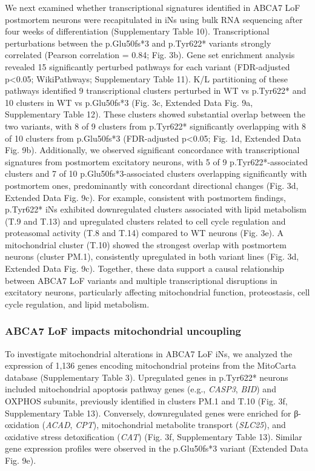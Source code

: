 We next examined whether transcriptional signatures identified in ABCA7 LoF postmortem neurons were recapitulated in iNs using bulk RNA sequencing after four weeks of differentiation (Supplementary Table 10). Transcriptional perturbations between the p.Glu50fs*3 and p.Tyr622* variants strongly correlated (Pearson correlation = 0.84; Fig. 3b). Gene set enrichment analysis revealed 15 significantly perturbed pathways for each variant (FDR-adjusted p<0.05; WikiPathways; Supplementary Table 11). K/L partitioning of these pathways identified 9 transcriptional clusters perturbed in WT vs p.Tyr622* and 10 clusters in WT vs p.Glu50fs*3 (Fig. 3c, Extended Data Fig. 9a, Supplementary Table 12). These clusters showed substantial overlap between the two variants, with 8 of 9 clusters from p.Tyr622* significantly overlapping with 8 of 10 clusters from p.Glu50fs*3 (FDR-adjusted p<0.05; Fig. 1d, Extended Data Fig. 9b). Additionally, we observed significant concordance with transcriptional signatures from postmortem excitatory neurons, with 5 of 9 p.Tyr622*-associated clusters and 7 of 10 p.Glu50fs*3-associated clusters overlapping significantly with postmortem ones, predominantly with concordant directional changes (Fig. 3d, Extended Data Fig. 9c). For example, consistent with postmortem findings, p.Tyr622* iNs exhibited downregulated clusters associated with lipid metabolism (T.9 and T.13) and upregulated clusters related to cell cycle regulation and proteasomal activity (T.8 and T.14) compared to WT neurons (Fig. 3e). A mitochondrial cluster (T.10) showed the strongest overlap with postmortem neurons (cluster PM.1), consistently upregulated in both variant lines (Fig. 3d, Extended Data Fig. 9c). Together, these data support a causal relationship between ABCA7 LoF variants and multiple transcriptional disruptions in excitatory neurons, particularly affecting mitochondrial function, proteostasis, cell cycle regulation, and lipid metabolism.

\subsubsection{ABCA7 LoF impacts mitochondrial uncoupling}
To investigate mitochondrial alterations in ABCA7 LoF iNs, we analyzed the expression of 1,136 genes encoding mitochondrial proteins from the MitoCarta database (Supplementary Table 3). Upregulated genes in p.Tyr622* neurons included mitochondrial apoptosis pathway genes (e.g., \textit{CASP3}, \textit{BID}) and OXPHOS subunits, previously identified in clusters PM.1 and T.10 (Fig. 3f, Supplementary Table 13). Conversely, downregulated genes were enriched for β-oxidation (\textit{ACAD}, \textit{CPT}), mitochondrial metabolite transport (\textit{SLC25}), and oxidative stress detoxification (\textit{CAT}) (Fig. 3f, Supplementary Table 13). Similar gene expression profiles were observed in the p.Glu50fs*3 variant (Extended Data Fig. 9e).

